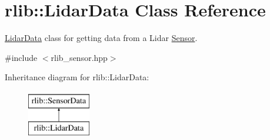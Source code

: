 \hypertarget{classrlib_1_1LidarData}{\section{rlib\-:\-:Lidar\-Data Class Reference}
\label{classrlib_1_1LidarData}
}


\hyperlink{classrlib_1_1LidarData}{Lidar\-Data} class for getting data from a Lidar \hyperlink{classrlib_1_1Sensor}{Sensor}.  




{\ttfamily \#include $<$rlib\-\_\-sensor.\-hpp$>$}

Inheritance diagram for rlib\-:\-:Lidar\-Data\-:\begin{figure}[H]
\begin{center}
\leavevmode
\includegraphics[height=2.000000cm]{classrlib_1_1LidarData}
\end{center}
\end{figure}
